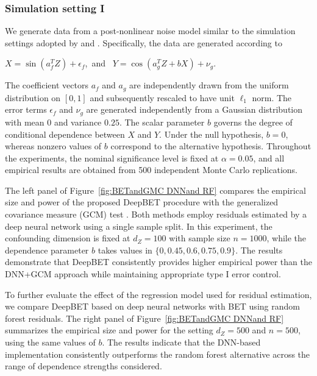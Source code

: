 \documentclass[12pt,reqno,oneside]{amsbook}
\theoremstyle{definition}
\theoremstyle{remark}
\begin{document}
\subsubsection*{Simulation setting I}

We generate data from a post-nonlinear noise model similar to the simulation settings adopted by \cite{shi2021double} and \cite{bellot2019conditional}. Specifically, the data are generated according to
\begin{center}
$X= \sin(a_f^{T}Z) + \epsilon_f$,\ and \ $ Y= \cos(a_g^{T}Z+ bX)+ \nu_g.$
\end{center}
The coefficient vectors $a_f$ and $a_g$ are independently drawn from the uniform distribution on $[0,1]$ and subsequently rescaled to have unit $\ell_1$ norm. The error terms $\epsilon_f$ and $\nu_g$ are generated independently from a Gaussian distribution with mean $0$ and variance $0.25$. The scalar parameter $b$ governs the degree of conditional dependence between $X$ and $Y$. Under the null hypothesis, $b=0$, whereas nonzero values of $b$ correspond to the alternative hypothesis. Throughout the experiments, the nominal significance level is fixed at $\alpha=0.05$, and all empirical results are obtained from 500 independent Monte Carlo replications.

\hspace{0.5cm}
The left panel of Figure~\ref{fig:BETandGMC DNNand RF} compares the empirical size and power of the proposed DeepBET procedure with the generalized covariance measure (GCM) test \cite{Shah_2020}. Both methods employ residuals estimated by a deep neural network using a single sample split. In this experiment, the confounding dimension is fixed at $d_Z=100$ with sample size $n=1000$, while the dependence parameter $b$ takes values in $\{0,0.45,0.6,0.75,0.9\}$. The results demonstrate that DeepBET consistently provides higher empirical power than the DNN+GCM approach while maintaining appropriate type I error control.

\hspace{0.5cm}
To further evaluate the effect of the regression model used for residual estimation, we compare DeepBET based on deep neural networks with BET using random forest residuals. The right panel of Figure~\ref{fig:BETandGMC DNNand RF} summarizes the empirical size and power for the setting $d_Z=500$ and $n=500$, using the same values of $b$. The results indicate that the DNN-based implementation consistently outperforms the random forest alternative across the range of dependence strengths considered.
\end{document}
